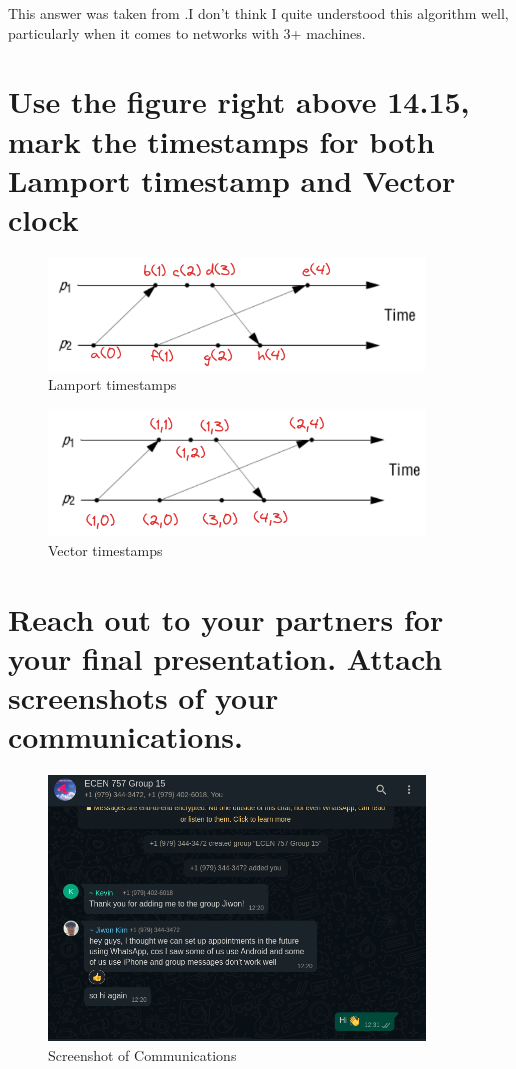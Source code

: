 \documentclass{article}
\begin{document}
This answer was taken from \citet{grc}.I don't think I quite understood this algorithm well, particularly when it comes to networks
with 3+ machines.

\section{Use the figure right above 14.15, mark the timestamps for both Lamport timestamp and Vector
clock}
\begin{figure}[H]
    \centering
    \includegraphics[width=10cm]{lamport.png}
    \caption{Lamport timestamps}
\end{figure}
\begin{figure}[H]
    \centering
    \includegraphics[width=10cm]{vector.png}
    \caption{Vector timestamps}
\end{figure}

\section{Reach out to your partners for your final presentation. Attach
screenshots of your communications.} 
\begin{figure}[H]
    \centering
    \includegraphics[width=10cm]{com_1.png}
    \caption{Screenshot of Communications}
\end{figure}


\end{document}
